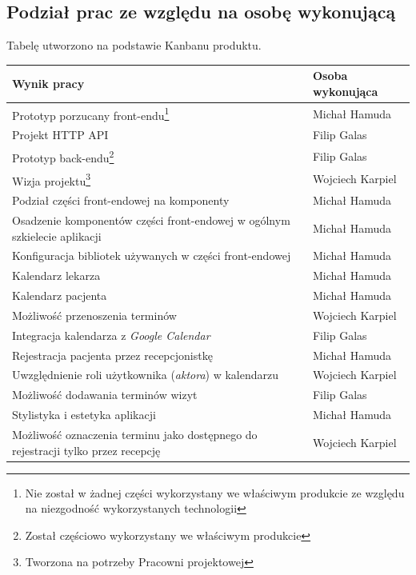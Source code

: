 \documentclass[polish,12pt]{aghthesis}
\begin{document}
  
\subsection{Podział prac ze względu na osobę wykonującą}
Tabelę utworzono na podstawie Kanbanu produktu.
\begin{center}
  \begin{tabular}{ | l | l | }
    \hline
    Wynik pracy & Osoba wykonująca \\ \hline \hline
    Prototyp  porzucany front-endu\footnote{Nie został w żadnej części wykorzystany we właściwym produkcie ze względu na niezgodność wykorzystanych technologii} & Michał Hamuda \\ \hline
    Projekt HTTP API & Filip Galas \\ \hline
    Prototyp back-endu\footnote{Został częściowo wykorzystany we właściwym produkcie} & Filip Galas  \\ \hline
    Wizja projektu\footnote{Tworzona na potrzeby Pracowni projektowej} & Wojciech Karpiel \\ \hline
    Podział części front-endowej na komponenty & Michał Hamuda \\ \hline
    Osadzenie komponentów części front-endowej w ogólnym szkielecie aplikacji & Michał Hamuda \\ \hline
    Konfiguracja bibliotek używanych w części front-endowej & Michał Hamuda \\ \hline
    Kalendarz lekarza & Michał Hamuda \\ \hline
     Kalendarz pacjenta & Michał Hamuda \\ \hline
    Możliwość przenoszenia terminów & Wojciech Karpiel \\ \hline
    Integracja kalendarza z \emph{Google Calendar} & Filip Galas \\ \hline
    Rejestracja pacjenta przez recepcjonistkę & Michał Hamuda \\ \hline
    Uwzględnienie roli użytkownika (\emph{aktora}) w kalendarzu & Wojciech Karpiel \\ \hline
    Możliwość dodawania terminów wizyt & Filip Galas \\ \hline
    Stylistyka i estetyka aplikacji & Michał Hamuda \\ \hline
    Możliwość oznaczenia terminu jako dostępnego do rejestracji tylko przez recepcję & Wojciech Karpiel \\ \hline

\end{tabular}
\end{center}
\end{document}
